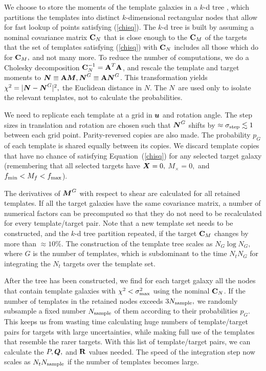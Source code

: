 \documentclass[11pt,preprint,flushrt]{aastex}
\def\eqq#1{Equation~(\ref{#1})}
\newcommand{\vecX}{\mbox{\boldmath $X$}}
\newcommand{\vecM}{\mbox{\boldmath $M$}}
\newcommand{\vecN}{\mbox{\boldmath $N$}}
\newcommand{\vecQ}{\mbox{\boldmath $Q$}}
\newcommand{\vecu}{\mbox{\boldmath $u$}}
\newcommand{\matR}{\mbox{$\bf R$}}
\newcommand{\matC}{\mbox{$\bf C$}}
\newcommand{\matA}{\mbox{$\bf A$}}
\newcommand\edit[1]{#1}
\begin{document}
We
choose to store the moments of the template galaxies in a $k$-d tree \citep{kdtree}, which
partitions the templates into distinct $k$-dimensional rectangular nodes that allow for
fast lookup of points satisfying (\ref{chisq}).  The $k$-d tree is
built by assuming a nominal covariance matrix $\matC_N$ that is close
enough to the $\matC_M$ of the targets that the set of templates satisfying
(\ref{chisq}) with $\matC_N$ includes all those which do for
$\matC_M,$ and not many more.
To reduce the number of computations, we do a Cholesky decomposition 
$\matC_N^{-1}=\matA^T\matA$, and
rescale the template and target moments to $\vecN\equiv \matA\vecM,
\vecN^G\equiv \matA\vecN^G$.  This transformation yields
$\chi^2 = |\vecN-\vecN^G|^2,$ the Euclidean distance in \vecN.    The
\vecN\ are used only to isolate the relevant templates, not to
calculate the probabilities.

We need to replicate each template at
a grid in $\vecu$ and rotation angle.  The step sizes in translation
and rotation are chosen such that $\vecN^G$ shifts by $\approx
\sigma_{\rm step}\lesssim 1$ between each grid point. Parity-reversed
copies are also made. The probability
$p_G$ of each template is shared equally between its copies.
We discard template copies
that have no chance of satisfying \eqq{chisq} for any
selected target galaxy (remembering that all selected targets have $\vecX=0,$
$M_\times=0,$ and $f_{\rm min}<M_f<f_{\rm max}$).

The derivatives of $\vecM^G$ with respect to shear are calculated for
all retained templates.  
If all the target galaxies have the same covariance matrix,  a number of numerical factors
can be precomputed so that they do not need to be recalculated for
every template/target pair.  Note that a new template set 
needs to be constructed, and the $k$-d tree partition repeated, if the
target $\matC_M$ changes by more
than $\approx10\%.$  The construction of the template tree scales as
$N_G\log N_G,$ where $G$ is the number of templates, which is subdominant to
the time $N_t N_G$ for integrating the $N_t$ targets over the template set.

After the tree has been constructed, we find for each target
galaxy all the nodes that contain template galaxies with
$\chi^2 < \sigma_{\rm max}^2$ using the nominal $\matC_N$.  
If the number of templates in the retained nodes exceeds $3N_{\rm
  sample},$ we randomly subsample a fixed number $N_{\rm sample}$ of
them according to their probabilities $p_G$.  This keeps us from
wasting time calculating huge numbers of template/target pairs for
targets with large uncertainties, while making full use of the
templates that resemble the rarer targets. 
With this list of template/target pairs, we can calculate the $P, \vecQ,$ and 
$\matR$ values needed.   The speed of the
integration step now scales as $N_tN_{\rm sample}$ \edit{if the number
  of templates becomes large.}
\end{document}
